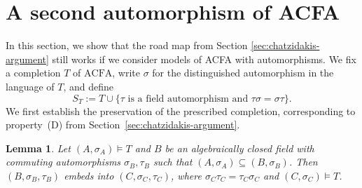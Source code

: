 \documentclass[10pt,a4paper]{amsart}
\newtheorem{lemma}[theorem]{Lemma}
\theoremstyle{definition}
\newcommand{\ACFA}{\mathrm{ACFA}}
\begin{document}
\section{A second automorphism of ACFA}\label{sec:acfa}
In this section, we show that the road map from Section \ref{sec:chatzidakis-argument} still works if we consider models of ACFA with automorphisms. We fix a completion $T$ of $\ACFA$, write $\sigma$ for the distinguished automorphism in the language of $T$, and define
\[
 S_T:=T\cup\{\text{$\tau$ is a field automorphism and $\tau\sigma=\sigma\tau$}\}.
\]
We first establish the preservation of the prescribed completion,
corresponding to property~(D) from
Section~\ref{sec:chatzidakis-argument}.
\begin{lemma}\label{a:lem:acfa}
Let $(A,\sigma_A)\models T$ and $B$ be an algebraically closed field with commuting automorphisms $\sigma_B,\tau_B$ such that $(A,\sigma_A)\subseteq (B,\sigma_B)$. Then $(B,\sigma_B,\tau_B)$ embeds into $(C,\sigma_C,\tau_C)$, where $\sigma_C\tau_C=\tau_C\sigma_C$ and $(C,\sigma_C)\models T$.
\end{lemma}
\end{document}
